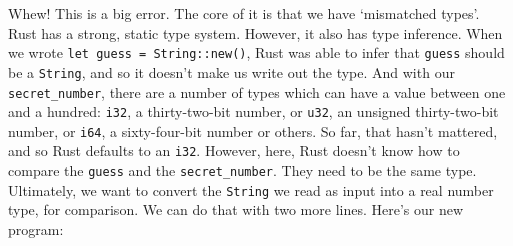 \documentclass[a4paper,]{book}
\newenvironment{Shaded}{\begin{snugshade}}{\end{snugshade}}
\newcommand{\KeywordTok}[1]{\textcolor[rgb]{0.13,0.29,0.53}{\textbf{{#1}}}}
\newcommand{\NormalTok}[1]{{#1}}
\begin{document}
\begin{Shaded}
\end{Shaded}

Whew! This is a big error. The core of it is that we have `mismatched
types'. Rust has a strong, static type system. However, it also has type
inference. When we wrote \texttt{let\ guess\ =\ String::new()}, Rust was
able to infer that \texttt{guess} should be a \texttt{String}, and so it
doesn't make us write out the type. And with our
\texttt{secret\_number}, there are a number of types which can have a
value between one and a hundred: \texttt{i32}, a thirty-two-bit number,
or \texttt{u32}, an unsigned thirty-two-bit number, or \texttt{i64}, a
sixty-four-bit number or others. So far, that hasn't mattered, and so
Rust defaults to an \texttt{i32}. However, here, Rust doesn't know how
to compare the \texttt{guess} and the \texttt{secret\_number}. They need
to be the same type. Ultimately, we want to convert the \texttt{String}
we read as input into a real number type, for comparison. We can do that
with two more lines. Here's our new program:
\end{document}
